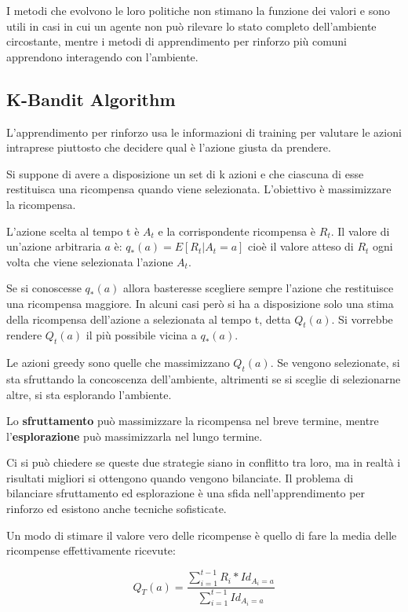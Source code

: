 I metodi che evolvono le loro politiche non stimano la funzione dei valori e sono utili
in casi in cui un agente non può rilevare lo stato completo dell'ambiente circostante,
mentre i metodi di apprendimento per rinforzo più comuni apprendono interagendo con l'ambiente.

\subsection{K-Bandit Algorithm}

L'apprendimento per rinforzo usa le informazioni di training per valutare le azioni intraprese
piuttosto che decidere qual è l'azione giusta da prendere.

Si suppone di avere a disposizione un set di k azioni e che ciascuna di esse restituisca
una ricompensa quando viene selezionata. L'obiettivo è massimizzare la ricompensa.

L'azione scelta al tempo t è $A_t$ e la corrispondente ricompensa è $R_t$.
Il valore di un'azione arbitraria $a$ è: $q_*(a) = E[R_t | A_t = a]$ cioè il valore atteso
di $R_t$ ogni volta che viene selezionata l'azione $A_t$.

Se si conoscesse $q_*(a)$ allora basteresse scegliere sempre l'azione che restituisce una
ricompensa maggiore. In alcuni casi però si ha a disposizione solo una stima della
ricompensa dell'azione a selezionata al tempo t, detta $Q_t(a)$. Si vorrebbe rendere
$Q_t(a)$ il più possibile vicina a $q_*(a)$.

Le azioni greedy sono quelle che massimizzano $Q_t(a)$. Se vengono selezionate, si sta
sfruttando la concoscenza dell'ambiente, altrimenti se si sceglie di selezionarne altre,
si sta esplorando l'ambiente.

Lo \textbf{sfruttamento} può massimizzare la ricompensa nel breve termine, mentre
l'\textbf{esplorazione} può massimizzarla nel lungo termine.

Ci si può chiedere se queste due strategie siano in conflitto tra loro, ma in realtà
i risultati migliori si ottengono quando vengono bilanciate. Il problema
di bilanciare sfruttamento ed esplorazione è una sfida nell'apprendimento per rinforzo
ed esistono anche tecniche sofisticate.

Un modo di stimare il valore vero delle ricompense è quello di fare la media delle 
ricompense effettivamente ricevute:

\begin{equation}
Q_T(a) = \frac{\sum_{i=1}^{t-1} R_i*Id_{A_i = a}}{\sum_{i=1}^{t-1} Id_{A_i = a}}
\end{equation}

